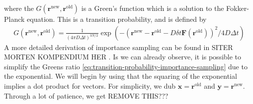 \documentclass[11pt]{article}
\newcommand{\husk}[1]{\color{red} #1 \color{black}}
\newcommand{\rn}{\mathbf{r}^\text{new}}
\newcommand{\ro}{\mathbf{r}^\text{old}}
\begin{document}
where the $G(\mathbf{r}^\text{new},\mathbf{r}^\text{old})$ is a Green's function which is a solution to the Fokker-Planck equation. This is a transition probability, and is defined by
\begin{align}
	G(\mathbf{r}^\text{new},\mathbf{r}^\text{old}) = \frac{1}{(4\pi D \Delta t)^{3N/2}}\exp \left(-(\rn - \ro - D\delta t \mathbf{F}(\ro))^2/4D\Delta t\right)
	\label{eq:greens-function}
\end{align}
A more detailed derivation of importance sampling can be found in \husk{SITER MORTEN KOMPENDIUM HER}. Is we can already observe, it is possible to simplify the Greens ratio \eqref{eq:transition-probability-importance-sampling} due to the exponential. We will begin by using that the squaring of the exponential implies a dot product for vectors. For simplicity, we dub $\mathbf{x} = \mathbf{r}^\text{old}$ and $\mathbf{y} = \mathbf{r}^\text{new}$. Through a lot of patience, we get \husk{REMOVE THIS???}
\end{document}
